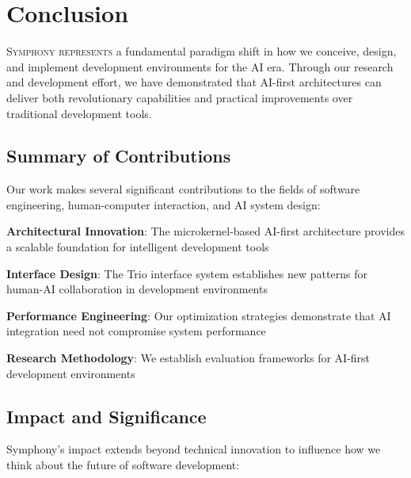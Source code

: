 
\section*{Conclusion}

\vspace{0.5cm}
\lettrine{S}{ymphony represents} a fundamental paradigm shift in how we conceive, design, and implement development environments for the AI era. Through our research and development effort, we have demonstrated that AI-first architectures can deliver both revolutionary capabilities and practical improvements over traditional development tools.

\subsection*{Summary of Contributions}

Our work makes several significant contributions to the fields of software engineering, human-computer interaction, and AI system design:

\begin{expandedlist}
    \item \textbf{Architectural Innovation}: The microkernel-based AI-first architecture provides a scalable foundation for intelligent development tools
    \item \textbf{Interface Design}: The Trio interface system establishes new patterns for human-AI collaboration in development environments
    \item \textbf{Performance Engineering}: Our optimization strategies demonstrate that AI integration need not compromise system performance
    \item \textbf{Research Methodology}: We establish evaluation frameworks for AI-first development environments
\end{expandedlist}

\subsection*{Impact and Significance}

Symphony's impact extends beyond technical innovation to influence how we think about the future of software development:

